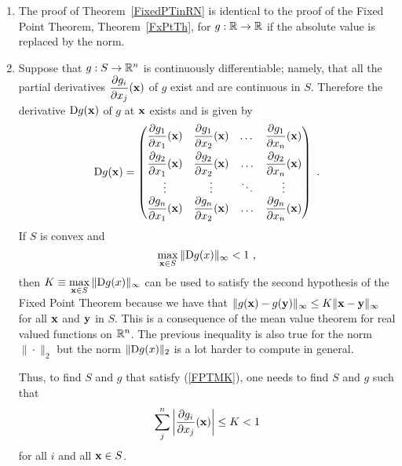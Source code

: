 \begin{rmkList}
\begin{enumerate}
\item The proof of Theorem~\ref{FixedPTinRN} is identical to the proof of
the Fixed Point Theorem, Theorem~\ref{FxPtTh}, for
$g:\mathbb{R} \rightarrow \mathbb{R}$ if the absolute value is replaced by the
norm.
\item Suppose that $g:S\to \mathbb{R}^n$ is continuously differentiable;
namely, that all the partial derivatives
$\displaystyle \frac{\partial{g_i}}{\partial{x_j}}(\mathbf{x})$ of $g$
exist and are continuous in $S$.  Therefore the derivative
$\mathrm{D} g(\mathbf{x})$ of $g$ at $\mathbf{x}$ exists and is given by
\[
\mathrm{D} g(\mathbf{x}) = \begin{pmatrix}
\displaystyle \frac{\partial{g_1}}{\partial{x_1}}(\mathbf{x}) &
\displaystyle \frac{\partial{g_1}}{\partial{x_2}}(\mathbf{x}) & \dots &
\displaystyle \frac{\partial{g_1}}{\partial{x_n}}(\mathbf{x}) \\[0.8em]
\displaystyle \frac{\partial{g_2}}{\partial{x_1}}(\mathbf{x}) &
\displaystyle \frac{\partial{g_2}}{\partial{x_2}}(\mathbf{x}) & \ldots &
\displaystyle \frac{\partial{g_2}}{\partial{x_n}}(\mathbf{x}) \\
\vdots & \vdots & \ddots & \vdots \\
\displaystyle \frac{\partial{g_n}}{\partial{x_1}}(\mathbf{x}) &
\displaystyle \frac{\partial{g_n}}{\partial{x_2}}(\mathbf{x}) & \ldots &
\displaystyle \frac{\partial{g_n}}{\partial{x_n}}(\mathbf{x})
\end{pmatrix} \ .
\]
If $S$ is convex and
\begin{equation}\label{FPTMK}
\max_{\mathbf{x} \in S} \|\mathrm{D} g(x)\|_\infty < 1 \ ,
\end{equation}
then $\displaystyle K \equiv \max_{\mathbf{x} \in S} \|\mathrm{D} g(x)\|_\infty$ can
be used to satisfy the second hypothesis of the Fixed Point Theorem
because we have that
$\| g(\mathbf{x}) - g(\mathbf{y}) \|_\infty \leq K \| \mathbf{x} - \mathbf{y} \|_\infty$
for all $\mathbf{x}$ and $\mathbf{y}$ in $S$.
This is a consequence of the mean value theorem for real valued
functions on $\mathbb{R}^n$.  The previous inequality is also true for the norm
$\|\cdot\|_2$ but the norm $\|\mathrm{D} g(x)\|_2$ is a lot harder to
compute in general.

Thus, to find $S$ and $g$ that satisfy (\ref{FPTMK}), one needs to
find $S$ and $g$ such that
\[
\sum_j^n \bigg|\frac{\partial{g_i}}{\partial{x_j}}(\mathbf{x})\bigg| \leq K < 1
\]
for all $i$ and all $\mathbf{x} \in S$.
\end{enumerate}
\label{rmkKcondFP}
\end{rmkList}

